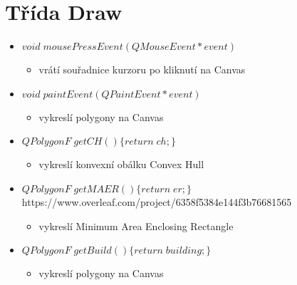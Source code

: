 \documentclass[oneside,12pt,a4paper]{book}
\begin{document}
   \section{Třída Draw} 
    \begin{itemize}
    \item $void\; mousePressEvent(QMouseEvent *event)$
    \begin{itemize}
    \item vrátí souřadnice kurzoru po kliknutí na Canvas
    \end{itemize}
    \item $void\; paintEvent(QPaintEvent *event)$
    \begin{itemize}
    \item vykreslí polygony na Canvas
    \end{itemize}
    
    \item $QPolygonF\; getCH()\{return\; ch;\}$
    \begin{itemize}
    \item vykreslí konvexní obálku Convex Hull
    \end{itemize}
    
    \item $QPolygonF\; getMAER()\{return\; er;\}$https://www.overleaf.com/project/6358f5384e144f3b76681565
    \begin{itemize}
    \item vykreslí Minimum Area Enclosing Rectangle
    \end{itemize}
    
    \item $QPolygonF\; getBuild()\{return\; building;\}$
    \begin{itemize}
    \item vykreslí polygony na Canvas
    \end{itemize}


\end{itemize}
\end{document}
